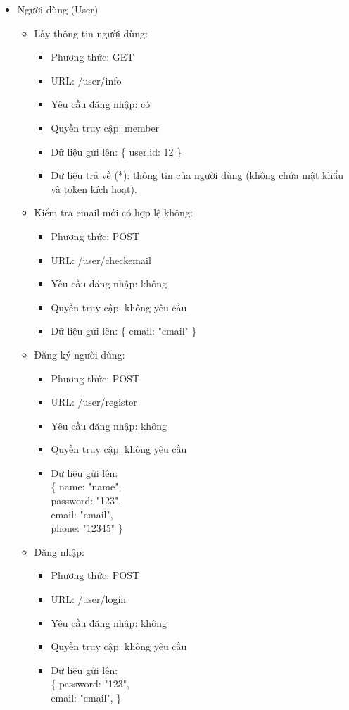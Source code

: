 \documentclass[a4paper,12pt,oneside]{article}
\begin{document}
\begin{itemize}
\item Người dùng (User) 
\begin{itemize}
\item Lấy thông tin người dùng: 
	\begin{itemize}
	\item Phương thức: GET
	\item URL: /user/info
	\item Yêu cầu đăng nhập: có
	\item Quyền truy cập: member
	\item Dữ liệu gửi lên: \{ user.id: 12 \}
	\item Dữ liệu trả về (*): thông tin của người dùng (không chứa mật khẩu và token kích hoạt).
	\end{itemize}

\item Kiểm tra email mới có hợp lệ không: 
	\begin{itemize}
	\item Phương thức: POST
	\item URL: /user/checkemail
	\item Yêu cầu đăng nhập: không
	\item Quyền truy cập: không yêu cầu
	\item Dữ liệu gửi lên: \{ email: "email" \}
	\end{itemize}
	
\item Đăng ký người dùng: 
	\begin{itemize}
	\item Phương thức: POST
	\item URL: /user/register
	\item Yêu cầu đăng nhập: không
	\item Quyền truy cập: không yêu cầu
	\item Dữ liệu gửi lên:\\ 
		\{
  			name: "name",\\
  			password: "123",\\
  			email: "email",\\
  			phone: "12345"
		\}

	\end{itemize}
	
\item Đăng nhập: 
	\begin{itemize}
	\item Phương thức: POST
	\item URL: /user/login
	\item Yêu cầu đăng nhập: không
	\item Quyền truy cập: không yêu cầu
	\item Dữ liệu gửi lên:\\ 
		\{
  			password: "123",\\
  			email: "email",
		\}


\end{itemize}
\end{itemize}
\end{itemize}
\end{document}
